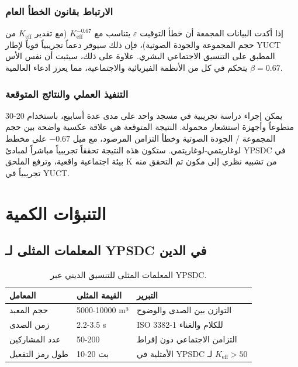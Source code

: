 \documentclass[12pt,a4paper]{article}
\newcommand{\Keff}{K_{\mathrm{eff}}}
\begin{document}
	\subsubsection{الارتباط بقانون الخطأ العام}
	إذا أكدت البيانات المجمعة أن خطأ التوقيت \(\varepsilon\) يتناسب مع \(\Keff^{-0.67}\) (مع تقدير \(\Keff\) من حجم المجموعة والجودة الصوتية)، فإن ذلك سيوفر دعماً تجريبياً قوياً لإطار YUCT المطبق على التنسيق الاجتماعي البشري. علاوة على ذلك، سيثبت أن نفس الأس \(\beta=0.67\) يتحكم في كل من الأنظمة الفيزيائية والاجتماعية، مما يعزز ادعاء العالمية.
	
	\subsubsection{التنفيذ العملي والنتائج المتوقعة}
	يمكن إجراء دراسة تجريبية في مسجد واحد على مدى عدة أسابيع، باستخدام 20-30 متطوعاً وأجهزة استشعار محمولة. النتيجة المتوقعة هي علاقة عكسية واضحة بين حجم المجموعة / الجودة الصوتية وخطأ التزامن المرصود، مع ميل \(-0.67\) على مخطط لوغاريتمي‐لوغاريتمي. ستكون هذه النتيجة تحققاً تجريبياً مباشراً لمبادئ YPSDC في بيئة اجتماعية واقعية، وترفع الملحق K من تشبيه نظري إلى مكون تم التحقق منه تجريبياً في YUCT.
	
	\section{التنبؤات الكمية}
	
	\subsection{المعلمات المثلى لـ YPSDC في الدين}
	
	\begin{table}[h]
		\centering
		\begin{tabular}{p{}p{}p{}}
			\toprule
			\textbf{المعامل} & \textbf{القيمة المثلى} & \textbf{التبرير} \\
			\midrule
			حجم المعبد & 5000-10000 m³ & التوازن بين الصدى والوضوح \\
			زمن الصدى & 2.2-3.5 s & ISO 3382-1 للكلام والغناء \\
			عدد المشاركين & 50-200 & التزامن الاجتماعي دون إفراط \\
			طول رمز التفعيل & 10-20 بت & الأمثلية في YPSDC لـ $K_{\mathrm{eff}} > 50$ \\
			\bottomrule
		\end{tabular}
		\caption{المعلمات المثلى للتنسيق الديني عبر YPSDC.}
		\label{tab:optimal-params}
	\end{table}
	
\end{document}
